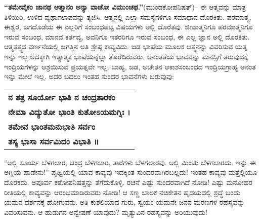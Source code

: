\textbf{“ತಮೇವೈಕಂ ಜಾನಥ ಆತ್ಮಾನಂ ಅನ್ಯಾ ವಾಚೋ ವಿಮುಂಚಥ.”}\break (ಮುಂಡಕೋಪನಿಷತ್​)– ಈ ಆತ್ಮವನ್ನು ಮಾತ್ರ ತಿಳಿಯಿರಿ, ಉಳಿದ ವ್ಯರ್ಥಾ\-ಲಾಪವನ್ನು ತ್ಯಜಿಸಿ. ಆತ್ಮನಲ್ಲಿ ಎಲ್ಲಾ ಸಮಸ್ಯೆಗಳಿಗೂ ಸಮಾಧಾನ ದೊರಕಿತು. ಪರಮಾತ್ಮ, ಈಶ್ವರ, ಜಗದೊಡೆಯ ಈ ಎಲ್ಲರಿಗೆ ಸಂಬಂಧಪಟ್ಟ ವಿಷಯಗಳು ಅಲ್ಲಿ ದೊರೆತವು. ಜೀವಾತ್ಮನಿಗೂ ಪರಮಾತ್ಮನಿಗೂ ಇರುವ ಸಂಬಂಧ, ಮಾನವ ಕರ್ತವ್ಯ, ಅವನಿಗೂ ಇತರರಿಗೂ ಇರುವ ಸಂಬಂಧ, ಈ ಎಲ್ಲ ಜ್ಞಾನ ಅಲ್ಲಿ ದೊರಕಿತು. ಆತ್ಮತತ್ತ್ವದ ವರ್ಣನೆಯಲ್ಲಿ ಜಗತ್ತಿನ ಅತಿ ಶ್ರೇಷ್ಠ ಕಾವ್ಯವಿದು. ಜಡ ಭಾಷೆಯ ಮೂಲಕ ಆತ್ಮನನ್ನು ವಿವರಿಸುವ ಯತ್ನ ಇನ್ನು ಇಲ್ಲ.\break ಅದಕ್ಕಾಗಿ ಇತ್ಯಾತ್ಮಕ  ಭಾಷೆಯನ್ನೆಲ್ಲಾ ತೊರೆದಿರುವರು. ಅನಂತತೆಯ ಭಾವವನ್ನು ಮನಸ್ಸಿಗೆ ತರುವುದಕ್ಕೆ ಇಂದ್ರಿಯಗಳನ್ನು ಆಶ್ರಯಿಸುವ ಪ್ರಯತ್ನವೇ ಇಲ್ಲ. ಬಾಹ್ಯ, ಜಡ, ಅಚೇತನ ಆಕಾಶಸಂಬಂಧದ ಇಂದ್ರಿಯಗ್ರಾಹ್ಯ ಅನಂತ ಇನ್ನು ಮೇಲೆ ಇಲ್ಲ. ಅದರ ಬದಲು ಇಂತಹ ಸುಂದರ ಭಾವನೆಗಳು ಬರುವುವು:

\vskip 2pt

\begin{longtable}[r]{@{}l@{}}
\textbf{ನ ತತ್ರ ಸೂರ್ಯೋ ಭಾತಿ ನ ಚಂದ್ರತಾರಕಂ} \\
\textbf{ನೇಮಾ ವಿದ್ಯುತೋ ಭಾಂತಿ ಕುತೋಽಯಮಗ್ನಿಃ ।} \\
\textbf{ತಮೇವ ಭಾಂತಮನುಭಾತಿ ಸರ್ವಂ} \\
\textbf{ತಸ್ಯ ಭಾಸಾ ಸರ್ವಮಿದಂ ವಿಭಾತಿ ॥} \\
\end{longtable}

\vskip 2pt

“ಅಲ್ಲಿ ಸೂರ್ಯ ಬೆಳಗಲಾರ, ಚಂದ್ರ ಬೆಳಗಲಾರ, ತಾರೆಗಳು ಬೆಳಗ\-ಲಾರವು. ಅಲ್ಲಿ ಮಿಂಚು ಬೆಳಗಲಾರದು. ಇನ್ನು ಈ ಅಗ್ನಿಯ ಪಾಡೇನು!” ಪೃಥ್ವಿಯಲ್ಲಿ ಯಾವ ಕಾವ್ಯವು ಇದಕ್ಕಿಂತ ಸುಂದರವಾಗಿರಬಲ್ಲದು! ಇಂತಹ ಕಾವ್ಯವು ಮತ್ತೆಲ್ಲಿಯೂ ದೊರಕದು. ಅಪೂರ್ವ ಕಠೋಪನಿಷತ್ತನ್ನು ತೆಗೆದುಕೊಳ್ಳಿ. ರಚನೆ ಎಷ್ಟು ಸುಂದರವಾಗಿದೆ ನೋಡಿ! ಎಷ್ಟು ಮನೋಹರ ರೀತಿಯಲ್ಲಿ ಕಾವ್ಯವನ್ನು ಆರಂಭಮಾಡಿರುವರು ನೋಡಿ! ಆ ಸಣ್ಣ ಬಾಲಕ ನಚಿಕೇತನ ಹೃದಯದಲ್ಲಿ ಶ್ರದ್ಧೆ ಬಂದು ಯಮನ ದರ್ಶನಕ್ಕೆ ಹೋಗುವನು. ಅತಿ ಕುಶಲಿಯಾದ ಗುರು, ಸ್ವಯಂ ಯಮನೇ ಜನನ ಮರಣಗಳ ರಹಸ್ಯವನ್ನು ವಿವರಿಸುವನು. ಆ ಹುಡುಗನ ಅನ್ವೇಷಣೆ ಯಾವುದು? ಮೃತ್ಯುವಿನ ರಹಸ್ಯವನ್ನು ಅರಿಯುವುದು!


